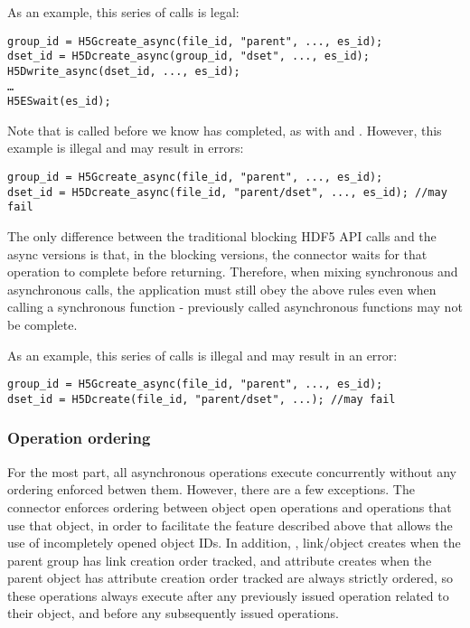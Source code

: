 \documentclass[../users_guide.tex]{subfiles}
\begin{document}
As an example, this series of calls is legal:

\begin{verbatim}
group_id = H5Gcreate_async(file_id, "parent", ..., es_id);
dset_id = H5Dcreate_async(group_id, "dset", ..., es_id);
H5Dwrite_async(dset_id, ..., es_id);
…
H5ESwait(es_id);
\end{verbatim}

Note that  is called before we know
 has completed, as with
 and . However,
this example is illegal and may result in errors:

\begin{verbatim}
group_id = H5Gcreate_async(file_id, "parent", ..., es_id);
dset_id = H5Dcreate_async(file_id, "parent/dset", ..., es_id); //may fail
\end{verbatim}

The only difference between the traditional blocking HDF5 API calls and the
async versions is that, in the blocking versions, the connector waits for that
operation to complete before returning. Therefore, when mixing synchronous and
asynchronous calls, the application must still obey the above rules even when
calling a synchronous function - previously called asynchronous functions may
not be complete.

As an example, this series of calls is illegal and may result in an error:

\begin{verbatim}
group_id = H5Gcreate_async(file_id, "parent", ..., es_id);
dset_id = H5Dcreate(file_id, "parent/dset", ...); //may fail
\end{verbatim}

\subsubsection {Operation ordering}

For the most part, all asynchronous operations execute concurrently without any
ordering enforced betwen them. However, there are a few exceptions. The
connector enforces ordering between object open operations and operations that
use that object, in order to facilitate the feature described above that allows
the use of incompletely opened object IDs. In addition,
, link/object creates when the parent group
has link creation order tracked, and attribute creates when the parent object
has attribute creation order tracked are always strictly ordered, so these
operations always execute after any previously issued operation related to their
object, and before any subsequently issued operations.
\end{document}
